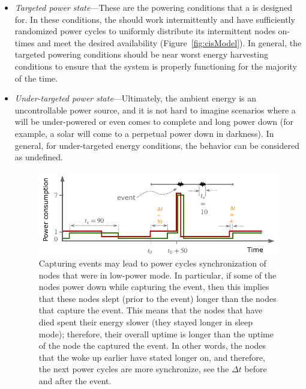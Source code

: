 \begin{itemize}
		\item \textit{Targeted power state}---These are the powering conditions that a \cis is designed for. In these  conditions, the \cis should work intermittently and have sufficiently randomized power cycles to uniformly distribute its intermittent nodes on-times and meet the desired availability (Figure~\ref{fig:cisModel}). In general, the targeted powering conditions should be near worst energy harvesting conditions to ensure that the system is properly functioning for the majority of the time.
		\item \textit{Under-targeted power state}---Ultimately, the ambient energy is an uncontrollable power source, and it is not hard to imagine scenarios where a \cis will be under-powered or even comes to complete and long power down (for example, a solar \cis will come to a perpetual power down in darkness). In general, for under-targeted energy conditions, the \cis behavior can be considered as undefined.
%
\begin{figure}
		\centering
		\includegraphics[width=\columnwidth]{figures/hibernatingState}
		\caption{
		Capturing events may lead to power cycles synchronization of nodes that were in low-power mode. In particular, if some of the nodes power down while capturing the event, then this implies that these nodes slept (prior to the event) longer than the nodes that capture the event. This means that the nodes that have died spent their energy slower (they stayed longer in sleep mode); therefore,  their overall uptime is longer than the uptime of the node the captured the event. In other words, the nodes that the woke up earlier have stated longer on, and therefore, the next power cycles are more synchronize, see the $\Delta t$ before and after the event.
}
\end{figure}
\end{itemize}
